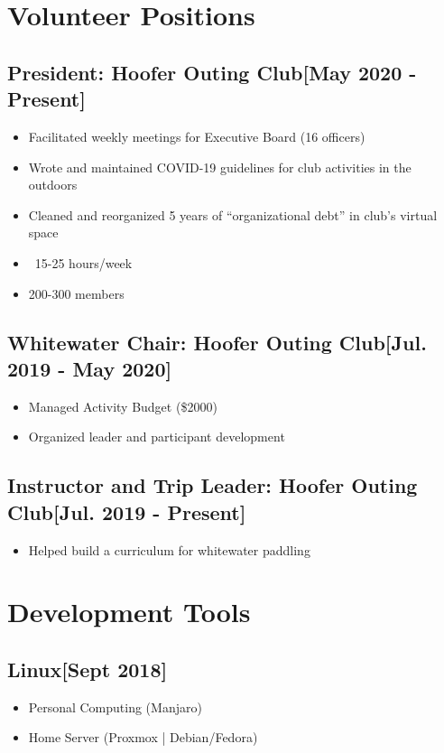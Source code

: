 \documentclass{article}
\begin{document}
\section{Volunteer Positions}

    \subsection{\textbf{President}: Hoofer Outing Club\hfill[May 2020 - Present]}
        \begin{itemize}
            \item Facilitated weekly meetings for Executive Board (16 officers)
            \item Wrote and maintained COVID-19 guidelines for club activities in the outdoors
            \item Cleaned and reorganized 5 years of ``organizational debt'' in club's virtual space
            \item ~15-25 hours/week
            \item 200-300 members
        \end{itemize}

    \subsection{\textbf{Whitewater Chair}: Hoofer Outing Club\hfill[Jul. 2019 - May 2020]}
        \begin{itemize}
            \item Managed Activity Budget (\$2000)
            \item Organized leader and participant development
        \end{itemize}

    \subsection{\textbf{Instructor and Trip Leader}: Hoofer Outing Club\hfill[Jul. 2019 - Present]}
        \begin{itemize}
            \item Helped build a curriculum for whitewater paddling
        \end{itemize}

\section{Development Tools}

    \subsection{\textbf{Linux}\hfill[Sept 2018]}
        \begin{itemize}
            \item Personal Computing (Manjaro)
            \item Home Server (Proxmox | Debian/Fedora)
        \end{itemize}
\end{document}
